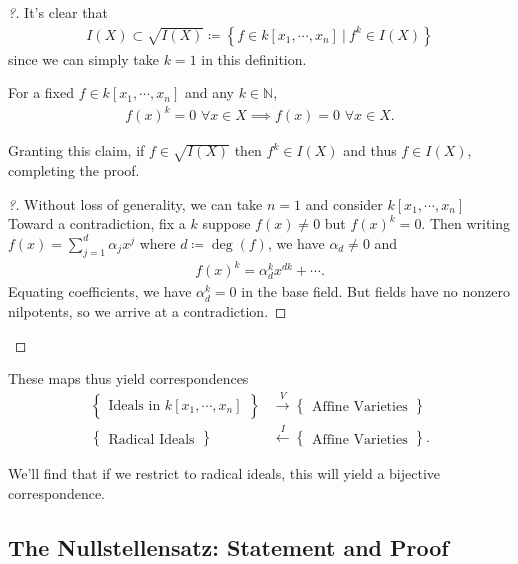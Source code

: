 \begin{proof}[?]

It's clear that
\begin{align*}
I(X) \subset \sqrt{I(X)} \coloneqq\left\{{f\in k[x_1, \cdots, x_{n}] {~\mathrel{\Big|}~}f^k \in I(X)}\right\}
\end{align*}
since we can simply take \(k=1\) in this definition.

\begin{claim}

For a fixed \(f\in k[x_1, \cdots, x_{n}]\) and any
\(k\in {\mathbb{N}}\),
\begin{align*}  
f(x)^k = 0\,\, \forall x\in X \implies f(x) = 0\,\, \forall x\in X
.\end{align*}

\end{claim}

Granting this claim, if \(f\in \sqrt{I(X)}\) then \(f^k \in I(X)\) and
thus \(f\in I(X)\), completing the proof.

\begin{proof}[?]

Without loss of generality, we can take \(n = 1\) and consider
\(k[x_1, \cdots, x_{n}]\) Toward a contradiction, fix a \(k\) suppose
\(f(x) \neq 0\) but \(f(x)^k = 0\). Then writing
\(f(x) = \sum_{j=1}^d \alpha_j x^j\) where \(d \coloneqq\deg(f)\), we
have \(\alpha_d \neq 0\) and
\begin{align*}  
f(x)^k = \alpha_d^k x^{dk} + \cdots
.\end{align*}
Equating coefficients, we have \(\alpha_d^k = 0\) in the base field. But
fields have no nonzero nilpotents, so we arrive at a contradiction.

\end{proof}

\end{proof}

These maps thus yield correspondences
\begin{align*}  
\left\{{\substack{\text{Ideals in } k[x_1, \cdots, x_n]}}\right\} &\xrightarrow{V} \left\{{\substack{\text{Affine Varieties}}}\right\} \\
\left\{{\substack{\text{Radical Ideals}}}\right\} &\xleftarrow{I} \left\{{\substack{\text{Affine Varieties}}}\right\}
.\end{align*}

We'll find that if we restrict to radical ideals, this will yield a
bijective correspondence.

\hypertarget{the-nullstellensatz-statement-and-proof}{%
\subsection{The Nullstellensatz: Statement and
Proof}\label{the-nullstellensatz-statement-and-proof}}

